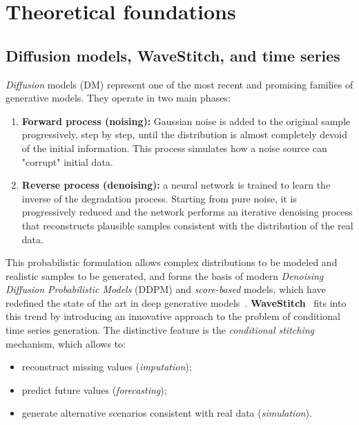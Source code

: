 \chapter{Theoretical foundations}
\section{Diffusion models, WaveStitch, and time series}

\textit{Diffusion} models (DM) represent one of the most recent and promising families of generative models. They operate in two main phases:

\begin{enumerate}
    \item \textbf{Forward process (noising):} Gaussian noise is added to the original sample progressively, step by step, until the distribution is almost completely devoid of the initial information. This process simulates how a noise source can "corrupt" initial data.
    
    \item \textbf{Reverse process (denoising):} a neural network is trained to learn the inverse of the degradation process. Starting from pure noise, it is progressively reduced and the network performs an iterative denoising process that reconstructs plausible samples consistent with the distribution of the real data.
\end{enumerate}
This probabilistic formulation allows complex distributions to be modeled and realistic samples to be generated, and forms the basis of modern \textit{Denoising Diffusion Probabilistic Models} (DDPM) and \textit{score-based} models, which have redefined the state of the art in deep generative models~\cite{sohldickstein2015,ho2020ddpm,song2020score,dhariwal2021improved}.  
\textbf{WaveStitch}~\cite{wavestitch} fits into this trend by introducing an innovative approach to the problem of conditional time series generation. The distinctive feature is the \textit{conditional stitching} mechanism, which allows to:

\begin{itemize}
    \item reconstruct missing values (\textit{imputation});
    \item predict future values (\textit{forecasting});
    \item generate alternative scenarios consistent with real data (\textit{simulation}).
\end{itemize} 

